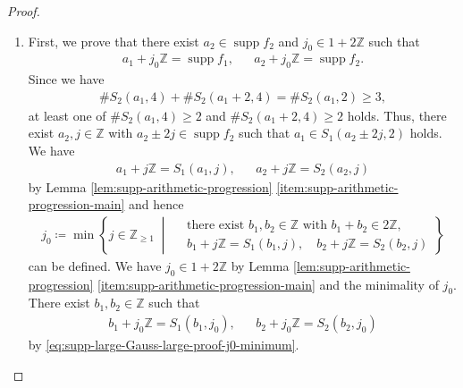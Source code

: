 \documentclass[10pt,a4paper]{amsart}
\DeclareMathOperator{\supp}{supp}
\begin{document}
\begin{proof}

\begin{enumerate}
    \item 

    First, we prove that there exist $ a_2 \in \supp f_2 $ and $ j_0 \in 1 + 2 \mathbb{ Z } $ such that
    \begin{align}
        a_1 + j_0 \mathbb{ Z } = \supp f_1, & &
        a_2 + j_0 \mathbb{ Z } = \supp f_2. \label{eq:supp-large-Gauss-large-proof-supp}
    \end{align}
    Since we have
    \begin{align}
        \# S_2 ( a_1 , 4 ) + \# S_2 ( a_1 + 2 , 4 ) = \# S_2 ( a_1 , 2 ) \geq 3,
    \end{align}
    at least one of $ \# S_2 ( a_1 , 4 ) \geq 2 $ and $ \# S_2 ( a_1 + 2 , 4 ) \geq 2 $ holds.
Thus, there exist $ a_2 , j \in \mathbb{ Z } $ with $ a_2 \pm 2 j \in \supp f_2 $ such that $ a_1 \in S_1 ( a_2 \pm 2 j , 2 ) $ holds.
We have
\begin{align}
    a_1 + j \mathbb{ Z } = S_1 ( a_1 , j ) , & &
    a_2 + j \mathbb{ Z } = S_2 ( a_2 , j )
\end{align}
by Lemma \ref{lem:supp-arithmetic-progression} \ref{item:supp-arithmetic-progression-main} and hence
\begin{align}
    j_0 
    \coloneqq \min \left\{ j\in\mathbb Z_{\geq1} \; \middle| \;
  \begin{aligned}
  & \text{there exist } b_1,b_2\in\mathbb Z
  \text{ with } b_1+b_2\in2\mathbb Z,\\
  & b_1+j\mathbb Z=S_1(b_1,j), \quad
  b_2+j\mathbb Z=S_2(b_2,j)
  \end{aligned}
\right\} \label{eq:supp-large-Gauss-large-proof-j0-minimum}
\end{align}
can be defined.
We have $ j_0 \in 1 + 2 \mathbb{ Z } $ by Lemma \ref{lem:supp-arithmetic-progression} \ref{item:supp-arithmetic-progression-main} and the minimality of $ j_0 $.
There exist $ b_1 , b_2 \in \mathbb{ Z } $ such that
\begin{align}
    b_1 + j_0 \mathbb{ Z } = S_1 ( b_1 , j_0 ), & &
    b_2 + j_0 \mathbb{ Z } = S_2 ( b_2 , j_0 ) \label{eq:supp-large-Gauss-large-proof-b1-b2-define}
\end{align}
by \eqref{eq:supp-large-Gauss-large-proof-j0-minimum}.


\end{enumerate}
\end{proof}
\end{document}

